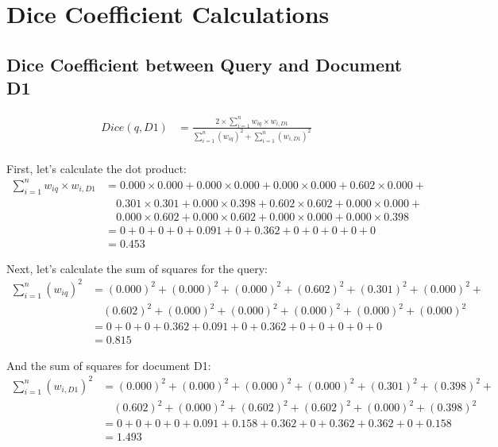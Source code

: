 \documentclass{article}
\begin{document}
\section{Dice Coefficient Calculations}

\subsection{Dice Coefficient between Query and Document D1}
\begin{align}
Dice(q, D1) &= \frac{2 \times \sum_{i=1}^{n} w_{iq} \times w_{i,D1}}{\sum_{i=1}^{n} (w_{iq})^2 + \sum_{i=1}^{n} (w_{i,D1})^2} \\
\end{align}

First, let's calculate the dot product:
\begin{align}
\sum_{i=1}^{n} w_{iq} \times w_{i,D1} &= 0.000 \times 0.000 + 0.000 \times 0.000 + 0.000 \times 0.000 + 0.602 \times 0.000 + \\
&\quad 0.301 \times 0.301 + 0.000 \times 0.398 + 0.602 \times 0.602 + 0.000 \times 0.000 + \\
&\quad 0.000 \times 0.602 + 0.000 \times 0.602 + 0.000 \times 0.000 + 0.000 \times 0.398 \\
&= 0 + 0 + 0 + 0 + 0.091 + 0 + 0.362 + 0 + 0 + 0 + 0 + 0 \\
&= 0.453
\end{align}

Next, let's calculate the sum of squares for the query:
\begin{align}
\sum_{i=1}^{n} (w_{iq})^2 &= (0.000)^2 + (0.000)^2 + (0.000)^2 + (0.602)^2 + (0.301)^2 + (0.000)^2 + \\
&\quad (0.602)^2 + (0.000)^2 + (0.000)^2 + (0.000)^2 + (0.000)^2 + (0.000)^2 \\
&= 0 + 0 + 0 + 0.362 + 0.091 + 0 + 0.362 + 0 + 0 + 0 + 0 + 0 \\
&= 0.815
\end{align}

And the sum of squares for document D1:
\begin{align}
\sum_{i=1}^{n} (w_{i,D1})^2 &= (0.000)^2 + (0.000)^2 + (0.000)^2 + (0.000)^2 + (0.301)^2 + (0.398)^2 + \\
&\quad (0.602)^2 + (0.000)^2 + (0.602)^2 + (0.602)^2 + (0.000)^2 + (0.398)^2 \\
&= 0 + 0 + 0 + 0 + 0.091 + 0.158 + 0.362 + 0 + 0.362 + 0.362 + 0 + 0.158 \\
&= 1.493
\end{align}
\end{document}
